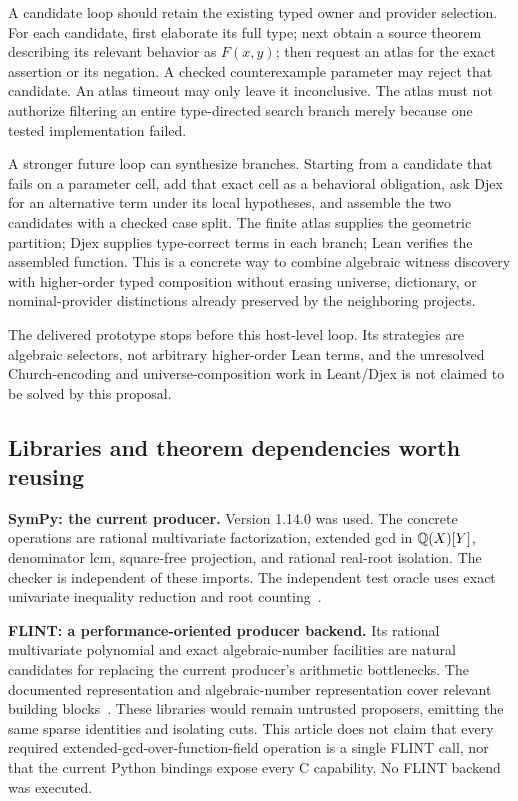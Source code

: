 A candidate loop should retain the existing typed owner and provider selection. For each candidate, first elaborate its full type; next obtain a source theorem describing its relevant behavior as $F(x,y)$; then request an atlas for the exact assertion or its negation. A checked counterexample parameter may reject that candidate. An atlas timeout may only leave it inconclusive. The atlas must not authorize filtering an entire type-directed search branch merely because one tested implementation failed.

A stronger future loop can synthesize branches. Starting from a candidate that fails on a parameter cell, add that exact cell as a behavioral obligation, ask Djex for an alternative term under its local hypotheses, and assemble the two candidates with a checked case split. The finite atlas supplies the geometric partition; Djex supplies type-correct terms in each branch; Lean verifies the assembled function. This is a concrete way to combine algebraic witness discovery with higher-order typed composition without erasing universe, dictionary, or nominal-provider distinctions already preserved by the neighboring projects.

The delivered prototype stops before this host-level loop. Its strategies are algebraic selectors, not arbitrary higher-order Lean terms, and the unresolved Church-encoding and universe-composition work in Leant/Djex is not claimed to be solved by this proposal.

\subsection{Libraries and theorem dependencies worth reusing}
\label{sec:libraries}
\textbf{SymPy: the current producer.} Version 1.14.0 was used. The concrete operations are rational multivariate factorization, extended gcd in $\mathbb Q(X)[Y]$, denominator lcm, square-free projection, and rational real-root isolation. The checker is independent of these imports. The independent test oracle uses exact univariate inequality reduction and root counting~\cite{sympy}.

\textbf{FLINT: a performance-oriented producer backend.} Its rational multivariate polynomial and exact algebraic-number facilities are natural candidates for replacing the current producer's arithmetic bottlenecks. The documented  representation and  algebraic-number representation cover relevant building blocks~\cite{flint-poly,flint-qqbar}. These libraries would remain untrusted proposers, emitting the same sparse identities and isolating cuts. This article does not claim that every required extended-gcd-over-function-field operation is a single FLINT call, nor that the current Python bindings expose every C capability. No FLINT backend was executed.

